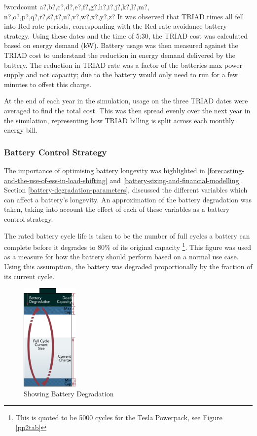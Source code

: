 \documentclass[fontsize=9.5pt]{extarticle}
\numberwithin{figure}{section} %
\newcounter{words}
\newenvironment{counted}{%
  \setcounter{words}{0}
  \SearchList!{wordcount}{\stepcounter{words}}
    {a?,b?,c?,d?,e?,f?,g?,h?,i?,j?,k?,l?,m?,
    n?,o?,p?,q?,r?,s?,t?,u?,v?,w?,x?,y?,z?}
  \UndoBoundary{'}
  \SearchOrder{p;}}{%
  \StopSearching}
\begin{document}
\begin{counted}
It was observed that TRIAD times all fell into Red rate periods,
corresponding with the Red rate avoidance battery strategy. Using these
dates and the time of 5:30, the TRIAD cost was calculated based on
energy demand (kW). Battery usage was then measured against the TRIAD
cost to understand the reduction in energy demand delivered by the
battery. The reduction in TRIAD rate was a factor of the batteries max
power supply and not capacity; due to the battery would only need to run
for a few minutes to offset this charge.

At the end of each year in the simulation, usage on the three TRIAD
dates were averaged to find the total cost. This was then spread evenly
over the next year in the simulation, representing how TRIAD billing is
split across each monthly energy bill.

\subsubsection{Battery Control Strategy}\label{battery-control-strategy}

The importance of optimising battery longevity was highlighted in
\ref{forecasting-and-the-use-of-ess-in-load-shifting} and
\ref{battery-sizing-and-financial-modelling}. Section
\ref{battery-degradation-parameters}, discussed the different variables
which can affect a battery's longevity. An approximation of the battery
degradation was taken, taking into account the effect of each of these
variables as a battery control strategy.

The rated battery cycle life is taken to be the number of full cycles a
battery can complete before it degrades to 80\% of its original capacity
\footnote{This is quoted to be 5000 cycles for the Tesla Powerpack, see Figure \ref{pp2tab}}.
This figure was used as a measure for how the battery should perform
based on a normal use case. Using this assumption, the battery was
degraded proportionally by the fraction of its current cycle.

\begin{figure}
\vspace{-25pt}
  \begin{center}
\includegraphics[trim = 0 0 0 0, clip, width=0.25\textwidth]{BatteryImage.pdf}
  \end{center}
  \caption{Showing Battery Degradation}
   \label{BatteryImage}
   \vspace{-30pt}
\end{figure}


\end{counted}
\end{document}
